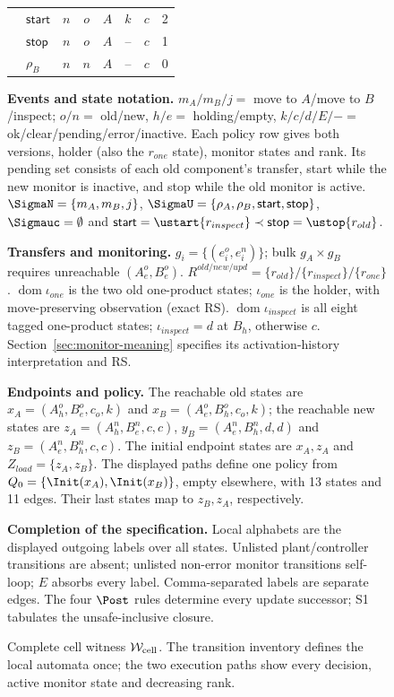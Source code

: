 \begin{figure}[!htbp]
{\begin{tabular}{@{}llcccccr@{}}
& $\mathsf{start}$ & $n$ & $o$ & $A$ & $k$ & $c$ & 2\\
& $\mathsf{stop}$ & $n$ & $o$ & $A$ & -- & $c$ & 1\\
& $\rho_B$ & $n$ & $n$ & $A$ & -- & $c$ & 0\\\bottomrule
\end{tabular}
\par\smallskip
\begin{minipage}{\linewidth}
\textbf{Events and state notation.} $m_A/m_B/j=$ move to $A$/move to $B$/inspect; $o/n=$ old/new, $h/e=$ holding/empty, $k/c/d/E/-=$ ok/clear/pending/error/inactive.
Each policy row gives both versions, holder (also the $r_{one}$ state), monitor states and rank.
Its pending set consists of each old component's transfer, start while the new monitor is inactive, and stop while the old monitor is active.
$\SigmaN=\{m_A,m_B,j\}$, $\SigmaU=\{\rho_A,\rho_B,\mathsf{start},\mathsf{stop}\}$, $\Sigmauc=\emptyset$ and $\mathsf{start}=\ustart{r_{inspect}}\prec\mathsf{stop}=\ustop{r_{old}}$.

\textbf{Transfers and monitoring.} $g_i=\{(e_i^o,e_i^n)\}$; bulk $g_A\times g_B$ requires unreachable $(A_e^o,B_e^o)$.
$R^{old/new/upd}=\{r_{old}\}/\{r_{inspect}\}/\{r_{one}\}$.
$\operatorname{dom}\iota_{one}$ is the two old one-product states; $\iota_{one}$ is the holder, with move-preserving observation (exact RS).
$\operatorname{dom}\iota_{inspect}$ is all eight tagged one-product states; $\iota_{inspect}=d$ at $B_h$, otherwise $c$.
Section~\ref{sec:monitor-meaning} specifies its activation-history interpretation and RS.

\textbf{Endpoints and policy.} The reachable old states are $x_A=(A_h^o,B_e^o,c_o,k)$ and $x_B=(A_e^o,B_h^o,c_o,k)$; the reachable new states are $z_A=(A_h^n,B_e^n,c,c)$, $y_B=(A_e^n,B_h^n,d,d)$ and $z_B=(A_e^n,B_h^n,c,c)$.
The initial endpoint states are $x_A,z_A$ and $Z_{load}=\{z_A,z_B\}$.
The displayed paths define one policy from $Q_0=\{\Init(x_A),\Init(x_B)\}$, empty elsewhere, with 13 states and 11 edges. Their last states map to $z_B,z_A$, respectively.

\textbf{Completion of the specification.} Local alphabets are the displayed outgoing labels over all states. Unlisted plant/controller transitions are absent; unlisted non-error monitor transitions self-loop; $E$ absorbs every label. Comma-separated labels are separate edges. The four $\Post$ rules determine every update successor; S1 tabulates the unsafe-inclusive closure.
\end{minipage}}
\caption{Complete cell witness $\mathcal W_{\rm cell}$. The transition inventory defines the local automata once; the two execution paths show every decision, active monitor state and decreasing rank.}
\label{fig:wcell-complete}
\end{figure}
